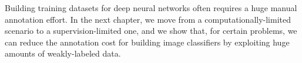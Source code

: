 Building training datasets for deep neural networks often requires a huge manual annotation effort.
In the next chapter, we move from a computationally-limited scenario to a supervision-limited one, and we show that, for certain problems, we can reduce the annotation cost for building image classifiers by exploiting huge amounts of weakly-labeled data.








